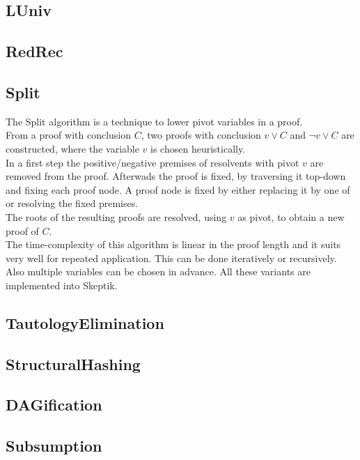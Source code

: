 \documentclass{llncs}
\begin{document}
\subsection{LUniv}

\subsection{RedRec}

\subsection{Split}

The Split \cite{CottonSplit} algorithm is a technique to lower pivot variables in a proof.\\
From a proof with conclusion $C$, two proofs with conclusion $v \vee C$ and $\neg{v} \vee C$ are constructed,  where the variable $v$ is chosen heuristically.\\
In a first step the positive/negative premises of resolvents with pivot $v$ are removed from the proof.
Afterwads the proof is fixed, by traversing it top-down and fixing each proof node.
A proof node is fixed by either replacing it by one of or resolving the fixed premises.\\ %
The roots of the resulting proofs are resolved, using $v$ as pivot, to obtain a new proof of $C$.\\
The time-complexity of this algorithm is linear in the proof length %
and it suits very well for repeated application. This can be done iteratively or recursively. Also multiple variables can be chosen in advance. 
All these variants are implemented into Skeptik.

\subsection{TautologyElimination}

\subsection{StructuralHashing}

\subsection{DAGification}

\subsection{Subsumption}
\end{document}
